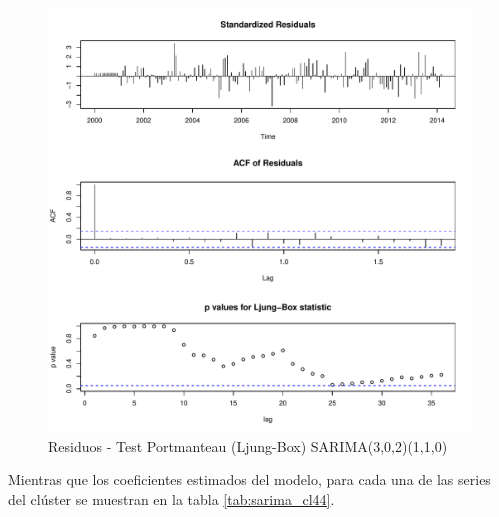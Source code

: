 \documentclass[12pt,oneside]{book}\usepackage[]{graphicx}\usepackage[]{color}
\makeatletter
\def\maxwidth{ %
  \ifdim\Gin@nat@width>\linewidth
    \linewidth
  \else
    \Gin@nat@width
  \fi
}
\newenvironment{knitrout}{}{} %
\theoremstyle{definition} %
\makeatother
\begin{document}
\begin{knitrout}
\color{fgcolor}\begin{figure}[h]

{\centering \includegraphics[width=\maxwidth]{figure/unnamed-chunk-92-1} 

}

\caption[Residuos - Test Portmanteau (Ljung-Box) SARIMA(3,0,2)(1,1,0)]{Residuos - Test Portmanteau (Ljung-Box) SARIMA(3,0,2)(1,1,0)}\label{fig:unnamed-chunk-92}
\end{figure}


\end{knitrout}


Mientras que los coeficientes estimados del modelo, para cada una de las series del clúster se muestran en la tabla \ref{tab:sarima_cl44}.
\end{document}
